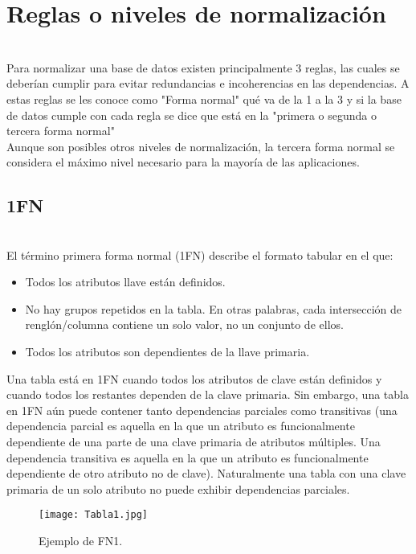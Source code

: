 \documentclass[spanish]{article}
\begin{document}
\section{Reglas o niveles de normalización}\\
Para normalizar una base de datos existen principalmente 3 reglas, las cuales se deberían cumplir para evitar redundancias e incoherencias en las dependencias. A estas reglas se les conoce como "Forma normal" qué va de la 1 a la 3 y si la base de datos cumple con cada regla se dice que está en la "primera o segunda o tercera forma normal"\\
    Aunque son posibles otros niveles de normalización, la tercera forma normal se considera el máximo nivel necesario para la mayoría de las aplicaciones.\CITE



 


\newpage

    \subsection{1FN}\\
     El término primera forma normal (1FN) describe el formato tabular en el que:
        \begin{itemize}
            \item Todos los atributos llave están definidos.
            \item 	No hay grupos repetidos en la tabla. En otras palabras, cada intersección de renglón/columna contiene un solo valor, no un conjunto de ellos.
            \item Todos los atributos son dependientes de la llave primaria.
        \end{itemize}
        Una tabla está en 1FN cuando todos los atributos de clave están definidos y cuando todos los restantes dependen de la clave primaria. Sin embargo, una tabla en 1FN aún puede contener tanto dependencias parciales como transitivas (una dependencia parcial es aquella en la que un atributo es funcionalmente dependiente de una parte de una clave primaria de atributos múltiples. Una dependencia transitiva es aquella en la que un atributo es funcionalmente dependiente de otro atributo no de clave). Naturalmente una tabla con una clave primaria de un solo atributo no puede exhibir dependencias parciales.
        
    \begin{figure}[h]
    \centering
    \texttt{[image: Tabla1.jpg]}
    \caption{Ejemplo de FN1.}
    \label{fig:comu}
    \end{figure}
\end{document}
